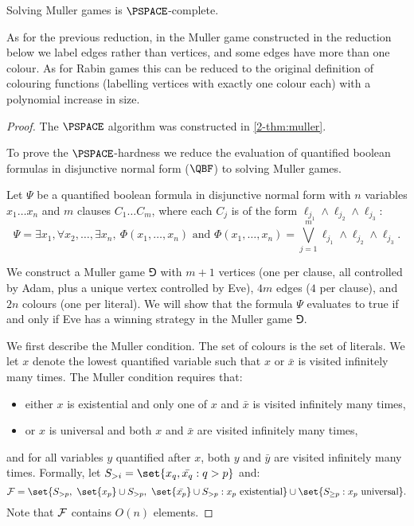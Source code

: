 \begin{theorem}
\label{2-thm:complexity_Muller}
Solving Muller games is $\PSPACE$-complete.
\end{theorem}

As for the previous reduction, in the Muller game constructed in the reduction below we label edges rather than vertices,
and some edges have more than one colour.
As for Rabin games this can be reduced to the original definition of colouring functions (labelling vertices with exactly one colour each) with a polynomial increase in size.

\begin{proof}
The $\PSPACE$ algorithm was constructed in \cref{2-thm:muller}.

To prove the $\PSPACE$-hardness we reduce the evaluation of quantified boolean formulas in disjunctive normal form ($\QBF$) to solving Muller games. 

Let $\Psi$ be a quantified boolean formula in disjunctive normal form with $n$ variables $x_1 \ldots x_n$ and $m$ clauses $C_1 \dots C_m$, where each $C_j$ is of the form $\ell_{j_1} \wedge \ell_{j_2} \wedge \ell_{j_3}$:
\[
\Psi = \exists x_1,\forall x_2,\ldots,\exists x_n,\ \Phi(x_1,\dots,x_n) \text{ and } 
\Phi(x_1,\dots,x_n) = \bigvee_{j=1}^m \ell_{j_1} \wedge \ell_{j_2} \wedge \ell_{j_3}.
\]

We construct a Muller game $\Game$ with $m+1$ vertices (one per clause, all controlled by Adam, plus a unique vertex controlled by Eve), $4m$ edges ($4$ per clause), and $2n$ colours (one per literal).
We will show that the formula $\Psi$ evaluates to true if and only if Eve has a winning strategy in the Muller game $\Game$.

We first describe the Muller condition. 
The set of colours is the set of literals.
We let $x$ denote the lowest quantified variable such that $x$ or $\bar{x}$ is visited infinitely many times. 
The Muller condition requires that:
\begin{itemize}
	\item either $x$ is existential and only one of $x$ and $\bar{x}$ is visited infinitely many times,
	\item or $x$ is universal and both $x$ and $\bar{x}$ are visited infinitely many times,
\end{itemize}
and for all variables $y$ quantified after $x$, both $y$ and $\bar{y}$ are visited infinitely many times.
Formally, let $S_{> i} = \set{x_q, \bar{x_q} : q > p}$ and:
\[
\F = \set{ S_{> p},\ \set{x_p} \cup S_{> p},\ \set{\bar{x_p}} \cup S_{> p} : x_p \text{ existential}} \cup \set{ S_{\ge p} : x_p \text{ universal}}.
\]
Note that $\mathcal{F}$ contains $O(n)$ elements.


\end{proof}
